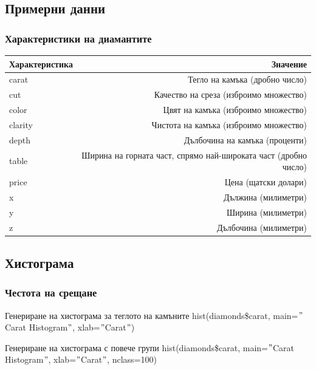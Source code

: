 \documentclass{beamer}
\begin{document}
\subsection{Примерни данни}

\begin{frame}
\frametitle{Характеристики на диамантите}
\begin{table}[ht]
\centering
\tiny
\begin{tabular}{|l|r|} 
  \hline
  Характеристика & Значение \\ [0.1ex] 
  \hline\hline
  carat & Тегло на камъка (дробно число) \\
  \hline
  cut & Качество на среза (изброимо множество) \\
  \hline
  color & Цвят на камъка (изброимо множество) \\
  \hline
  clarity & Чистота на камъка (изброимо множество) \\
  \hline
  depth & Дълбочина на камъка (проценти) \\
  \hline
  table & Ширина на горната част, спрямо най-широката част (дробно число) \\
  \hline
  price & Цена (щатски долари) \\
  \hline
  x & Дължина (милиметри) \\
  \hline
  y & Ширина (милиметри) \\
  \hline
  z & Дълбочина (милиметри) \\
  \hline
\end{tabular}
\end{table}
\end{frame}

\subsection{Хистограма}

\begin{frame}
\frametitle{Честота на срещане}
\begin{block}{Генериране на хистограма за теглото на камъните}
hist(diamonds\$carat, main=$"$Carat Histogram$"$, xlab=$"$Carat$"$)
\end{block}

\begin{block}{Генериране на хистограма с повече групи}
hist(diamonds\$carat, main=$"$Carat Histogram$"$, xlab=$"$Carat$"$, nclass=100)
\end{block}
\end{frame}
\end{document}
